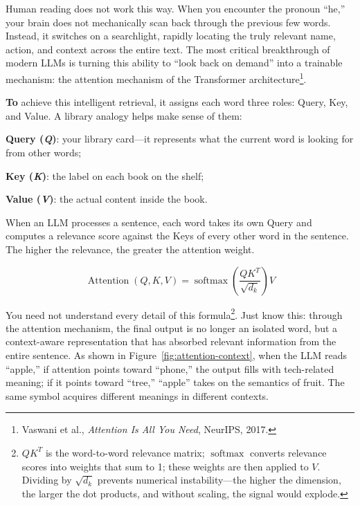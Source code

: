 \vspace{1em}

Human reading does not work this way. When you encounter the pronoun ``he,'' your brain does not mechanically scan back through the previous few words. Instead, it switches on a searchlight, rapidly locating the truly relevant name, action, and context across the entire text. The most critical breakthrough of modern LLMs is turning this ability to ``look back on demand'' into a trainable mechanism: the attention mechanism of the Transformer architecture\footnote{Vaswani et al., \textit{Attention Is All You Need}, NeurIPS, 2017.}.


\vspace{1em}

\textbf{To} achieve this intelligent retrieval, it assigns each word three roles: Query, Key, and Value.
A library analogy helps make sense of them:

\textbf{Query (\textit{Q})}: your library card---it represents what the current word is looking for from other words;

\textbf{Key (\textit{K})}: the label on each book on the shelf;

\textbf{Value (\textit{V})}: the actual content inside the book.

\vspace{1em}

When an LLM processes a sentence, each word takes its own Query and computes a relevance score against the Keys of every other word in the sentence. The higher the relevance, the greater the attention weight.

\begin{equation*}
\operatorname{Attention}(Q, K, V) = \operatorname{softmax}\left(\frac{QK^T}{\sqrt{d_k}}\right)V
\end{equation*}

\vspace{1em}

You need not understand every detail of this formula\footnote{$QK^T$ is the word-to-word relevance matrix; $\operatorname{softmax}$ converts relevance scores into weights that sum to 1; these weights are then applied to $V$. Dividing by $\sqrt{d_k}$ prevents numerical instability---the higher the dimension, the larger the dot products, and without scaling, the signal would explode.}. Just know this: through the attention mechanism, the final output is no longer an isolated word, but a context-aware representation that has absorbed relevant information from the entire sentence. As shown in Figure~\ref{fig:attention-context}, when the LLM reads ``apple,'' if attention points toward ``phone,'' the output fills with tech-related meaning; if it points toward ``tree,'' ``apple'' takes on the semantics of fruit. The same symbol acquires different meanings in different contexts.


